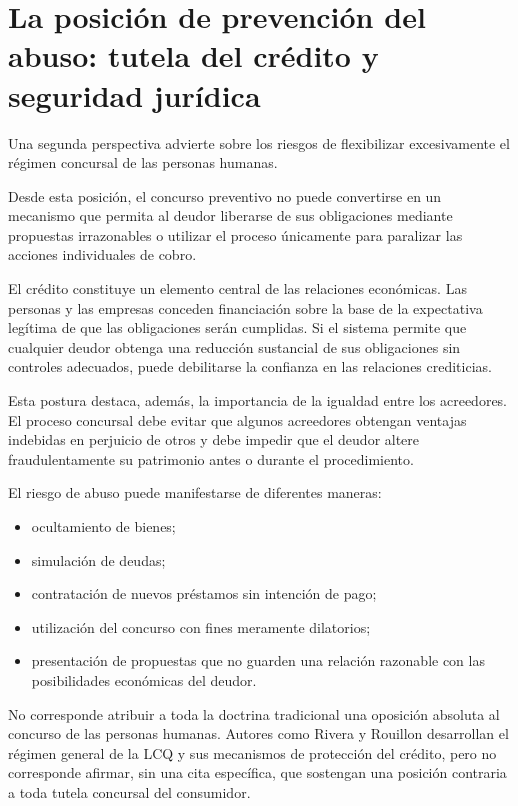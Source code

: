 \documentclass[12pt,oneside]{book}
\begin{document}
\section{La posición de prevención del abuso: tutela del crédito y seguridad jurídica}

Una segunda perspectiva advierte sobre los riesgos de flexibilizar excesivamente el régimen concursal de las personas humanas.

Desde esta posición, el concurso preventivo no puede convertirse en un mecanismo que permita al deudor liberarse de sus obligaciones mediante propuestas irrazonables o utilizar el proceso únicamente para paralizar las acciones individuales de cobro.

El crédito constituye un elemento central de las relaciones económicas. Las personas y las empresas conceden financiación sobre la base de la expectativa legítima de que las obligaciones serán cumplidas. Si el sistema permite que cualquier deudor obtenga una reducción sustancial de sus obligaciones sin controles adecuados, puede debilitarse la confianza en las relaciones crediticias.

Esta postura destaca, además, la importancia de la igualdad entre los acreedores. El proceso concursal debe evitar que algunos acreedores obtengan ventajas indebidas en perjuicio de otros y debe impedir que el deudor altere fraudulentamente su patrimonio antes o durante el procedimiento.

El riesgo de abuso puede manifestarse de diferentes maneras:
\begin{itemize}
    \item ocultamiento de bienes;
    \item simulación de deudas;
    \item contratación de nuevos préstamos sin intención de pago;
    \item utilización del concurso con fines meramente dilatorios;
    \item presentación de propuestas que no guarden una relación razonable con las posibilidades económicas del deudor.
\end{itemize}

\begin{note}
No corresponde atribuir a toda la doctrina tradicional una oposición absoluta al concurso de las personas humanas. Autores como Rivera y Rouillon desarrollan el régimen general de la LCQ y sus mecanismos de protección del crédito, pero no corresponde afirmar, sin una cita específica, que sostengan una posición contraria a toda tutela concursal del consumidor.
\end{note}
\end{document}

